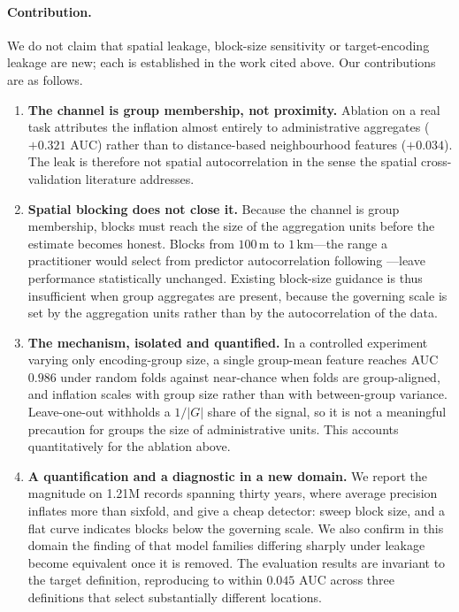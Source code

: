 \documentclass[11pt]{article}
\begin{document}
\paragraph{Contribution.}
We do not claim that spatial leakage, block-size sensitivity or target-encoding
leakage are new; each is established in the work cited above. Our contributions
are as follows.

\begin{enumerate}
\item \textbf{The channel is group membership, not proximity.} Ablation on a real
task attributes the inflation almost entirely to administrative aggregates
($+0.321$ AUC) rather than to distance-based neighbourhood features ($+0.034$).
The leak is therefore not spatial autocorrelation in the sense the spatial
cross-validation literature addresses.

\item \textbf{Spatial blocking does not close it.} Because the channel is group
membership, blocks must reach the size of the aggregation units before the
estimate becomes honest. Blocks from $100$\,m to $1$\,km---the range a
practitioner would select from predictor autocorrelation following
\citet{stock2025}---leave performance statistically unchanged. Existing
block-size guidance is thus insufficient when group aggregates are present,
because the governing scale is set by the aggregation units rather than by the
autocorrelation of the data.

\item \textbf{The mechanism, isolated and quantified.} In a controlled
experiment varying only encoding-group size, a single group-mean feature reaches
AUC $0.986$ under random folds against near-chance when folds are group-aligned,
and inflation scales with group size rather than with between-group variance.
Leave-one-out withholds a $1/|G|$ share of the signal, so it is not a meaningful
precaution for groups the size of administrative units. This accounts
quantitatively for the ablation above.

\item \textbf{A quantification and a diagnostic in a new domain.} We report the
magnitude on 1.21M records spanning thirty years, where average precision
inflates more than sixfold, and give a cheap detector: sweep block size, and a
flat curve indicates blocks below the governing scale. We also confirm in this
domain the finding of \citet{rosenblatt2024} that model families differing
sharply under leakage become equivalent once it is removed. The evaluation
results are invariant to the target definition, reproducing to within $0.045$
AUC across three definitions that select substantially different locations.


\end{enumerate}
\end{document}
